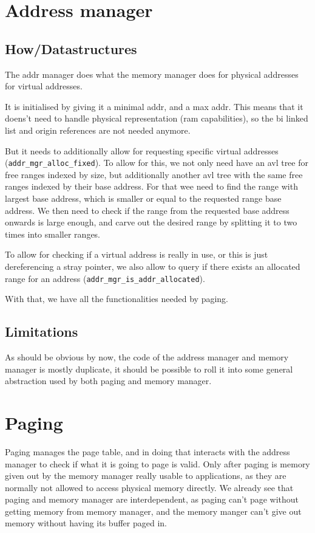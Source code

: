 \section{Address manager}

\subsection{How/Datastructures}

The addr manager does what the memory manager does for physical addresses for
virtual addresses.

It is initialised by giving it a minimal addr, and a max addr.
This means that it doens't need to handle physical representation (ram
capabilities), so the bi linked list and origin references are not needed anymore.

But it needs to additionally allow for requesting specific virtual addresses
(\verb|addr_mgr_alloc_fixed|).
To allow for this, we not only need have an avl tree for free ranges indexed by
size, but additionally another avl tree with the same free ranges indexed by
their base address.
For that wee need to find the range with largest base address, which is smaller
or equal to the requested range base address.
We then need to check if the range from the requested base address onwards is
large enough, and carve out the desired range by splitting it to two times into
smaller ranges.

To allow for checking if a virtual address is really in use, or this is just
dereferencing a stray pointer, we also allow to query if there exists an
allocated range for an address (\verb|addr_mgr_is_addr_allocated|).

With that, we have all the functionalities needed by paging.

\subsection{Limitations}

As should be obvious by now, the code of the address manager and memory manager
is mostly duplicate, it should be possible to roll it into some general
abstraction used by both paging and memory manager.

\section{Paging}
\label{sec:paging}

Paging manages the page table, and in doing that interacts with the address
manager to check if what it is going to page is valid.
Only after paging is memory given out by the memory manager really usable to
applications, as they are normally not allowed to access physical memory
directly.
We already see that paging and memory manager are interdependent, as
paging can't page without getting memory from memory manager, and the memory
manger can't give out memory without having its buffer paged in.

